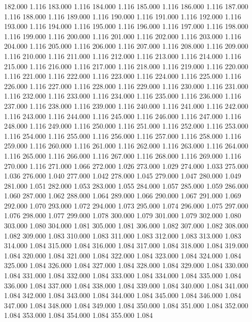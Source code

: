 182.000 1.116 
183.000 1.116 
184.000 1.116 
185.000 1.116 
186.000 1.116 
187.000 1.116 
188.000 1.116 
189.000 1.116 
190.000 1.116 
191.000 1.116 
192.000 1.116 
193.000 1.116 
194.000 1.116 
195.000 1.116 
196.000 1.116 
197.000 1.116 
198.000 1.116 
199.000 1.116 
200.000 1.116 
201.000 1.116 
202.000 1.116 
203.000 1.116 
204.000 1.116 
205.000 1.116 
206.000 1.116 
207.000 1.116 
208.000 1.116 
209.000 1.116 
210.000 1.116 
211.000 1.116 
212.000 1.116 
213.000 1.116 
214.000 1.116 
215.000 1.116 
216.000 1.116 
217.000 1.116 
218.000 1.116 
219.000 1.116 
220.000 1.116 
221.000 1.116 
222.000 1.116 
223.000 1.116 
224.000 1.116 
225.000 1.116 
226.000 1.116 
227.000 1.116 
228.000 1.116 
229.000 1.116 
230.000 1.116 
231.000 1.116 
232.000 1.116 
233.000 1.116 
234.000 1.116 
235.000 1.116 
236.000 1.116 
237.000 1.116 
238.000 1.116 
239.000 1.116 
240.000 1.116 
241.000 1.116 
242.000 1.116 
243.000 1.116 
244.000 1.116 
245.000 1.116 
246.000 1.116 
247.000 1.116 
248.000 1.116 
249.000 1.116 
250.000 1.116 
251.000 1.116 
252.000 1.116 
253.000 1.116 
254.000 1.116 
255.000 1.116 
256.000 1.116 
257.000 1.116 
258.000 1.116 
259.000 1.116 
260.000 1.116 
261.000 1.116 
262.000 1.116 
263.000 1.116 
264.000 1.116 
265.000 1.116 
266.000 1.116 
267.000 1.116 
268.000 1.116 
269.000 1.116 
270.000 1.116 
271.000 1.066 
272.000 1.026 
273.000 1.029 
274.000 1.033 
275.000 1.036 
276.000 1.040 
277.000 1.042 
278.000 1.045 
279.000 1.047 
280.000 1.049 
281.000 1.051 
282.000 1.053 
283.000 1.055 
284.000 1.057 
285.000 1.059 
286.000 1.060 
287.000 1.062 
288.000 1.064 
289.000 1.066 
290.000 1.067 
291.000 1.069 
292.000 1.070 
293.000 1.072 
294.000 1.073 
295.000 1.074 
296.000 1.075 
297.000 1.076 
298.000 1.077 
299.000 1.078 
300.000 1.079 
301.000 1.079 
302.000 1.080 
303.000 1.080 
304.000 1.081 
305.000 1.081 
306.000 1.082 
307.000 1.082 
308.000 1.082 
309.000 1.083 
310.000 1.083 
311.000 1.083 
312.000 1.083 
313.000 1.083 
314.000 1.084 
315.000 1.084 
316.000 1.084 
317.000 1.084 
318.000 1.084 
319.000 1.084 
320.000 1.084 
321.000 1.084 
322.000 1.084 
323.000 1.084 
324.000 1.084 
325.000 1.084 
326.000 1.084 
327.000 1.084 
328.000 1.084 
329.000 1.084 
330.000 1.084 
331.000 1.084 
332.000 1.084 
333.000 1.084 
334.000 1.084 
335.000 1.084 
336.000 1.084 
337.000 1.084 
338.000 1.084 
339.000 1.084 
340.000 1.084 
341.000 1.084 
342.000 1.084 
343.000 1.084 
344.000 1.084 
345.000 1.084 
346.000 1.084 
347.000 1.084 
348.000 1.084 
349.000 1.084 
350.000 1.084 
351.000 1.084 
352.000 1.084 
353.000 1.084 
354.000 1.084 
355.000 1.084 
